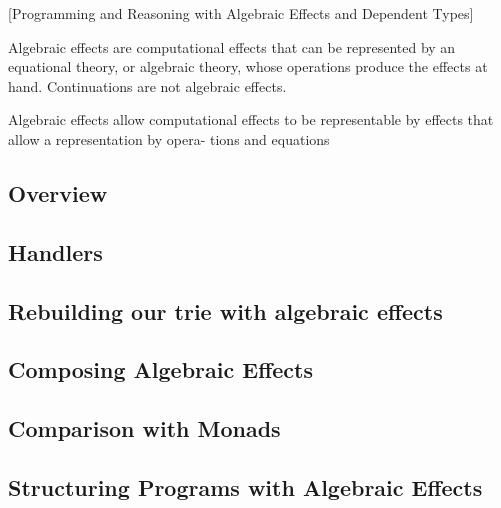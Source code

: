 [Programming and Reasoning with Algebraic Effects and Dependent Types]


Algebraic effects are computational effects that can be represented by an equational theory, or algebraic theory, whose operations produce the effects at hand.
Continuations are not algebraic effects.

Algebraic effects allow computational effects to be representable by
effects that allow a representation by opera- tions and equations

\subsection{Overview}
\subsection{Handlers}
\subsection{Rebuilding our trie with algebraic effects}
\subsection{Composing Algebraic Effects}
\subsection{Comparison with Monads}
\subsection{Structuring Programs with Algebraic Effects}
